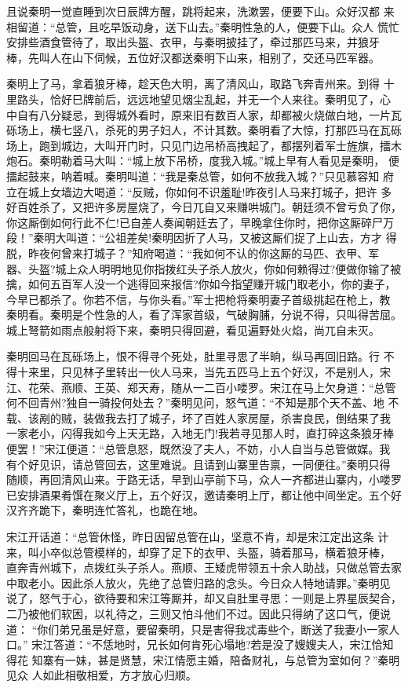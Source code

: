 且说秦明一觉直睡到次日辰牌方醒，跳将起来，洗漱罢，便要下山。众好汉都
来相留道：“总管，且吃早饭动身，送下山去。”秦明性急的人，便要下山。众人
慌忙安排些酒食管待了，取出头盔、衣甲，与秦明披挂了，牵过那匹马来，并狼牙
棒，先叫人在山下伺候，五位好汉都送秦明下山来，相别了，交还马匹军器。

秦明上了马，拿着狼牙棒，趁天色大明，离了清风山，取路飞奔青州来。到得
十里路头，恰好巳牌前后，远远地望见烟尘乱起，并无一个人来往。秦明见了，心
中自有八分疑忌，到得城外看时，原来旧有数百人家，却都被火烧做白地，一片瓦
砾场上，横七竖八，杀死的男子妇人，不计其数。秦明看了大惊，打那匹马在瓦砾
场上，跑到城边，大叫开门时，只见门边吊桥高拽起了，都摆列着军士旌旗，擂木
炮石。秦明勒着马大叫：“城上放下吊桥，度我入城。”城上早有人看见是秦明，
便擂起鼓来，呐着喊。秦明叫道：“我是秦总管，如何不放我入城？”只见慕容知
府立在城上女墙边大喝道：“反贼，你如何不识羞耻!昨夜引人马来打城子，把许
多好百姓杀了，又把许多房屋烧了，今日兀自又来赚哄城门。朝廷须不曾亏负了你，
你这厮倒如何行此不仁!已自差人奏闻朝廷去了，早晚拿住你时，把你这厮碎尸万
段！”秦明大叫道：“公祖差矣!秦明因折了人马，又被这厮们捉了上山去，方才
得脱，昨夜何曾来打城子？”知府喝道：“我如何不认的你这厮的马匹、衣甲、军
器、头盔?城上众人明明地见你指拨红头子杀人放火，你如何赖得过?便做你输了被
擒，如何五百军人没一个逃得回来报信?你如今指望赚开城门取老小，你的妻子，
今早已都杀了。你若不信，与你头看。”军士把枪将秦明妻子首级挑起在枪上，教
秦明看。秦明是个性急的人，看了浑家首级，气破胸脯，分说不得，只叫得苦屈。
城上弩箭如雨点般射将下来，秦明只得回避，看见遍野处火焰，尚兀自未灭。

秦明回马在瓦砾场上，恨不得寻个死处，肚里寻思了半晌，纵马再回旧路。行
不得十来里，只见林子里转出一伙人马来，当先五匹马上五个好汉，不是别人，宋
江、花荣、燕顺、王英、郑天寿，随从一二百小喽罗。宋江在马上欠身道：“总管
何不回青州?独自一骑投何处去？”秦明见问，怒气道：“不知是那个天不盖、地
不载、该剐的贼，装做我去打了城子，坏了百姓人家房屋，杀害良民，倒结果了我
一家老小，闪得我如今上天无路，入地无门!我若寻见那人时，直打碎这条狼牙棒
便罢！”宋江便道：“总管息怒，既然没了夫人，不妨，小人自当与总管做媒。我
有个好见识，请总管回去，这里难说。且请到山寨里告禀，一同便往。”秦明只得
随顺，再回清风山来。于路无话，早到山亭前下马，众人一齐都进山寨内，小喽罗
已安排酒果肴馔在聚义厅上，五个好汉，邀请秦明上厅，都让他中间坐定。五个好
汉齐齐跪下，秦明连忙答礼，也跪在地。

宋江开话道：“总管休怪，昨日因留总管在山，坚意不肯，却是宋江定出这条
计来，叫小卒似总管模样的，却穿了足下的衣甲、头盔，骑着那马，横着狼牙棒，
直奔青州城下，点拨红头子杀人。燕顺、王矮虎带领五十余人助战，只做总管去家
中取老小。因此杀人放火，先绝了总管归路的念头。今日众人特地请罪。”秦明见
说了，怒气于心，欲待要和宋江等厮并，却又自肚里寻思：一则是上界星辰契合，
二乃被他们软困，以礼待之，三则又怕斗他们不过。因此只得纳了这口气，便说道：
“你们弟兄虽是好意，要留秦明，只是害得我忒毒些个，断送了我妻小一家人口。”
宋江答道：“不恁地时，兄长如何肯死心塌地?若是没了嫂嫂夫人，宋江恰知得花
知寨有一妹，甚是贤慧，宋江情愿主婚，陪备财礼，与总管为室如何？”秦明见众
人如此相敬相爱，方才放心归顺。

